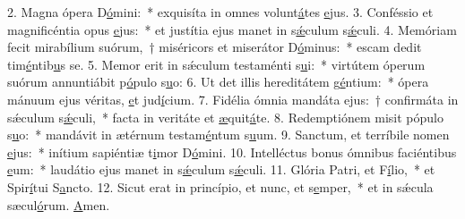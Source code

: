 2. Magna ópera D\uline{ó}mini:~* exquisíta in omnes volunt\uline{á}tes \uline{e}jus.
3. Conféssio et magnificéntia opus \uline{e}jus:~* et justítia ejus manet in s\uline{ǽ}culum s\uline{ǽ}culi.
4. Memóriam fecit mirabílium suórum,~† miséricors et miserátor D\uline{ó}minus:~* escam dedit tim\uline{é}ntib\uline{u}s se.
5. Memor erit in sǽculum testaménti s\uline{u}i:~* virtútem óperum suórum annuntiábit p\uline{ó}pulo s\uline{u}o:
6. Ut det illis hereditátem g\uline{é}ntium:~* ópera mánuum ejus véritas, \uline{e}t jud\uline{í}cium.
7. Fidélia ómnia mandáta ejus:~† confirmáta in sǽculum s\uline{ǽ}culi,~* facta in veritáte et \uline{æ}quit\uline{á}te.
8. Redemptiónem misit pópulo s\uline{u}o:~* mandávit in ætérnum testam\uline{é}ntum s\uline{u}um.
9. Sanctum, et terríbile nomen \uline{e}jus:~* inítium sapiéntiæ t\uline{i}mor D\uline{ó}mini.
10. Intelléctus bonus ómnibus faciéntibus \uline{e}um:~* laudátio ejus manet in s\uline{ǽ}culum s\uline{ǽ}culi.
11. Glória Patri, et F\uline{í}lio,~* et Spir\uline{í}tui S\uline{a}ncto.
12. Sicut erat in princípio, et nunc, et s\uline{e}mper,~* et in sǽcula sæcul\uline{ó}rum. \uline{A}men.
